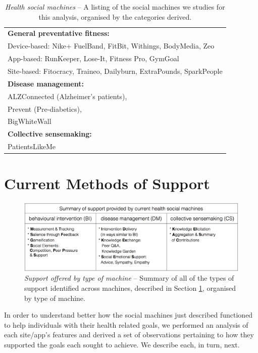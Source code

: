 \documentclass{sig-alternate}
\begin{document}
\begin{table}[htb]
\begin{center}
\begin{tabular}{|p{8cm}|}
\hline
{\bf General preventative fitness:} \\
Device-based: Nike+ FuelBand, FitBit, Withings, BodyMedia, Zeo \\
App-based: RunKeeper, Lose-It, Fitness Pro, GymGoal \\
Site-based: Fitocracy, Traineo, Dailyburn, ExtraPounds, SparkPeople  \\
\hline
{\bf Disease management:} \\
ALZConnected (Alzheimer's patients),  \\
Prevent (Pre-diabetics), \\
BigWhiteWall \\
\hline
{\bf Collective sensemaking:} \\
PatientsLikeMe \\
\hline
\end{tabular}
\end{center}
\caption{\emph{Health social machines} -- A listing of the social
  machines we studies for this analysis, organised by the categories
  derived.} \label{table:clusters}
\end{table}

\section{Current Methods of Support}
\label{sec:support}
\begin{figure}[htb]
\begin{center}
\includegraphics[width=14cm]{img/table2-summary.png}
\caption{\emph{Support offered by type of machine} -- Summary of all of
  the types of support identified across machines, described in
  Section \ref{sec:support}, organised by type of machine.} \label{fig:summaryofsupport}
\end{center}
\end{figure}


In order to understand better how the social machines just described
functioned to help individuals with their health related goals, we
performed an analysis of each site/app's features and derived a set of
observations pertaining to how they supported the goals each sought to
achieve.  We describe each, in turn, next.
\end{document}
